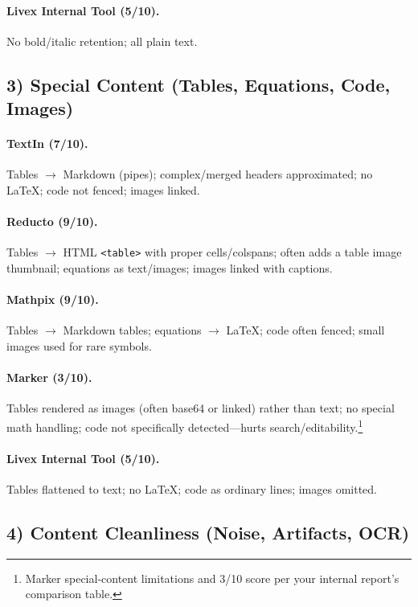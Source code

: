 \documentclass[11pt,a4paper]{article}
\begin{document}
\paragraph{Livex Internal Tool (5/10).}
No bold/italic retention; all plain text.

\subsection*{3) Special Content (Tables, Equations, Code, Images)}

\paragraph{TextIn (7/10).}
Tables $\to$ Markdown (pipes); complex/merged headers approximated; no LaTeX; code not fenced; images linked.

\paragraph{Reducto (9/10).}
Tables $\to$ HTML \verb|<table>| with proper cells/colspans; often adds a table image thumbnail; equations as text/images; images linked with captions.

\paragraph{Mathpix (9/10).}
Tables $\to$ Markdown tables; equations $\to$ LaTeX; code often fenced; small images used for rare symbols.

\paragraph{Marker (3/10).}
Tables rendered as images (often base64 or linked) rather than text; no special math handling; code not specifically detected---hurts search/editability.\footnote{Marker special-content limitations and 3/10 score per your internal report’s comparison table.}

\paragraph{Livex Internal Tool (5/10).}
Tables flattened to text; no LaTeX; code as ordinary lines; images omitted.

\subsection*{4) Content Cleanliness (Noise, Artifacts, OCR)}
\end{document}
